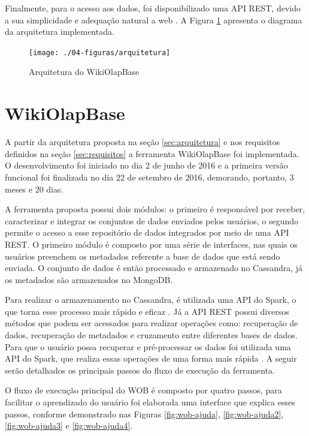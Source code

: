 Finalmente, para o acesso aos dados, foi disponibilizado uma API REST, devido a sua 
simplicidade e adequação natural a web \cite{maleshkova2010}. A Figura \ref{fig:arquitetura} apresenta o 
diagrama da arquitetura implementada.  

\begin{figure}[!htb]
    \centering
    \caption{Arquitetura do WikiOlapBase}
    \texttt{[image: ./04-figuras/arquitetura]}
    \label{fig:arquitetura}
\end{figure}

\section{WikiOlapBase}
\label{sec:wob}

A partir da arquitetura proposta na seção \ref{sec:arquitetura} e nos requisitos definidos
na seção \ref{sec:requisitos} a ferramenta WikiOlapBase foi implementada. O desenvolvimento 
foi iniciado no dia 2 de junho de 2016 e a primeira versão funcional foi finalizada no dia 
22 de setembro de 2016, demorando, portanto, 3 meses e 20 dias.

A ferramenta proposta possui dois módulos: o primeiro é responsável por receber, caracterizar
e integrar os conjuntos de dados enviados pelos usuários, o segundo permite o acesso a esse 
repositório de dados integrados por meio de uma API REST. O primeiro módulo é composto por 
uma série de interfaces, nas quais os usuários preenchem os metadados referente a base de 
dados que está sendo enviada. O conjunto de dados é então processado e armazenado no 
Cassandra, já os metadados são armazenados no MongoDB. 

Para realizar o armazenamento no Cassandra, é utilizada uma API do Spark, o que torna esse 
processo mais rápido e eficaz \cite{kolaczkowski2014}. Já a API REST possui diversos métodos 
que podem ser acessados para realizar operações como: recuperação de dados, recuperação de 
metadados e cruzamento entre diferentes bases de dados. Para que o usuário possa recuperar 
e pré-processar os dados foi utilizada uma API do Spark, que realiza essas operações de uma 
forma mais rápida \cite{kolaczkowski2014}. A seguir serão detalhados os principais passos 
do fluxo de execução da ferramenta.

O fluxo de execução principal do WOB é composto por quatro passos, para facilitar o 
aprendizado do usuário foi elaborada uma interface que explica esses passos, conforme
demonstrado nas Figuras \ref{fig:wob-ajuda}, \ref{fig:wob-ajuda2}, \ref{fig:wob-ajuda3} e
 \ref{fig:wob-ajuda4}.


